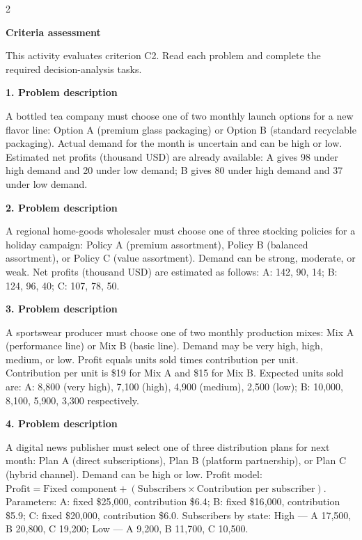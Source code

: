 \documentclass[12pt]{article}
\newcommand{\SubsectionBox}[1]{%
	\noindent\colorbox{gray!30}{%
		\parbox{\dimexpr\linewidth-2\fboxsep\relax}{\textbf{#1}}%
	}\par\vspace{0.35cm}%
}
\begin{document}
	\begin{multicols}{2}
		\SubsectionBox{Criteria assessment}\vspace{-0.25cm}
		This activity evaluates criterion C2. Read each problem and complete the required decision-analysis tasks.

		\vspace{0.25cm}
		\SubsectionBox{1. Problem description}\vspace{-0.25cm}
		A bottled tea company must choose one of two monthly launch options for a new flavor line:
				Option A (premium glass packaging) or Option B (standard recyclable packaging).
				Actual demand for the month is uncertain and can be high or low.
				Estimated net profits (thousand USD) are already available:
				A gives 98 under high demand and 20 under low demand;
				B gives 80 under high demand and 37 under low demand.

		\vspace{0.25cm}
		\SubsectionBox{2. Problem description}\vspace{-0.25cm}
		A regional home-goods wholesaler must choose one of three stocking policies for a holiday campaign:
				Policy A (premium assortment), Policy B (balanced assortment), or Policy C (value assortment).
				Demand can be strong, moderate, or weak.
				Net profits (thousand USD) are estimated as follows:
				A: 142, 90, 14; B: 124, 96, 40; C: 107, 78, 50.

		\vspace{0.25cm}
		\SubsectionBox{3. Problem description}\vspace{-0.25cm}
		A sportswear producer must choose one of two monthly production mixes:
				Mix A (performance line) or Mix B (basic line).
				Demand may be very high, high, medium, or low.
				Profit equals units sold times contribution per unit.
				Contribution per unit is \$19 for Mix A and \$15 for Mix B.
				Expected units sold are:
				A: 8{,}800 (very high), 7{,}100 (high), 4{,}900 (medium), 2{,}500 (low);
				B: 10{,}000, 8{,}100, 5{,}900, 3{,}300 respectively.

		\vspace{0.25cm}
		\SubsectionBox{4. Problem description}\vspace{-0.25cm}
		A digital news publisher must select one of three distribution plans for next month:
				Plan A (direct subscriptions), Plan B (platform partnership), or Plan C (hybrid channel).
				Demand can be high or low.
				Profit model: \(\text{Profit}=\text{Fixed component}+(\text{Subscribers}\times\text{Contribution per subscriber})\).
				Parameters:
				A: fixed \$25{,}000, contribution \$6.4;
				B: fixed \$16{,}000, contribution \$5.9;
				C: fixed \$20{,}000, contribution \$6.0.
				Subscribers by state:
				High --- A 17{,}500, B 20{,}800, C 19{,}200;
				Low --- A 9{,}200, B 11{,}700, C 10{,}500.


\end{multicols}
\end{document}
